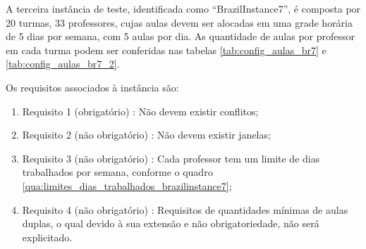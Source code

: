 A terceira instância de teste, identificada como ``BrazilInstance7'', é composta por 20 turmas, 33 professores, cujas aulas devem ser alocadas em uma grade horária de 5 dias por semana, com 5 aulas por dia. As quantidade de aulas por professor em cada turma podem ser conferidas nas tabelas \ref{tab:config_aulas_br7} e \ref{tab:config_aulas_br7_2}.



\newpage
Os requisitos associados à instância são:
\begin{enumerate}
	\item Requisito 1 (obrigatório) : Não devem existir conflitos;
	\item Requisito 2 (não obrigatório) : Não devem existir janelas;
	\item Requisito 3 (não obrigatório) : Cada professor tem um limite de dias trabalhados por semana, conforme o quadro \ref{qua:limites_dias_trabalhados_brazilinstance7};
	\item Requisito 4 (não obrigatório) : Requisitos de quantidades mínimas de aulas duplas, o qual devido à sua extensão e não obrigatoriedade, não será explicitado.
\end{enumerate}

